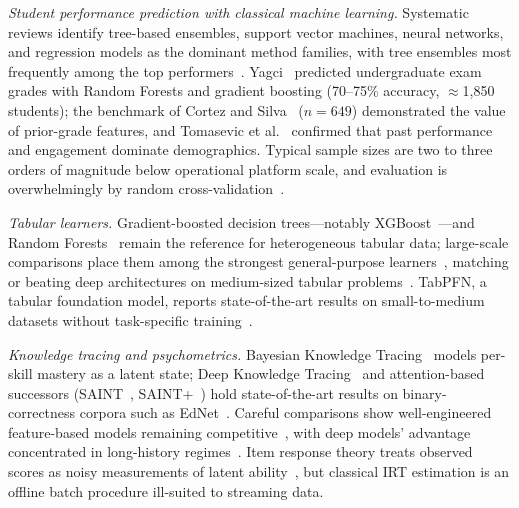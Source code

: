 \documentclass[11pt]{article}
\begin{document}
\textit{Student performance prediction with classical machine learning.}\quad
Systematic reviews identify tree-based ensembles, support vector machines, neural
networks, and regression models as the dominant method families, with tree ensembles most
frequently among the top performers~\cite{romero2020,zhang2021,baashar2021,aldin2024,hellas2018}.
Yagci~\cite{yagci2022} predicted undergraduate exam grades with Random Forests and gradient
boosting (70--75\% accuracy, $\approx$1,850 students);
the benchmark of Cortez and Silva~\cite{cortez2008} ($n=649$) demonstrated the value of
prior-grade features, and Tomasevic et al.~\cite{tomasevic2020} confirmed that past
performance and engagement dominate demographics.
Typical sample sizes are two to three orders of magnitude below operational platform scale,
and evaluation is overwhelmingly by random cross-validation~\cite{romero2020,zhang2021,hellas2018}.

\begin{sloppypar}
\textit{Tabular learners.}\quad
Gradient-boosted decision trees---notably XGBoost~\cite{chen2016}---and Random
Forests~\cite{breiman2001} remain the reference for heterogeneous tabular data;
large-scale comparisons place them among the strongest general-purpose
learners~\cite{fernandez2014}, matching or beating deep architectures on medium-sized
tabular problems~\cite{grinsztajn2022,shwartz2022}.
TabPFN, a tabular foundation model, reports state-of-the-art results on small-to-medium
datasets without task-specific training~\cite{hollmann2025}.
\end{sloppypar}

\textit{Knowledge tracing and psychometrics.}\quad
Bayesian Knowledge Tracing~\cite{corbett1994} models per-skill mastery as a latent state;
Deep Knowledge Tracing~\cite{piech2015} and attention-based successors
(SAINT~\cite{choi2020saint}, SAINT+~\cite{shin2021}) hold state-of-the-art results on
binary-correctness corpora such as EdNet~\cite{choi2020ednet}.
Careful comparisons show well-engineered feature-based models remaining
competitive~\cite{khajah2016,gervet2020}, with deep models' advantage concentrated in
long-history regimes~\cite{liu2021}.
Item response theory treats observed scores as noisy measurements of latent
ability~\cite{embretson2000}, but classical IRT estimation is an offline batch procedure
ill-suited to streaming data.
\end{document}
